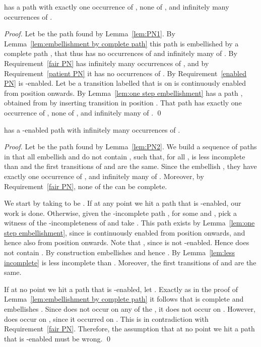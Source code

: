 \documentclass[smallcondensed]{svjour3}
\newcommand{\Lem}[1]{Lemma~\ref{lem:#1}}
\begin{document}
\begin{lemma}\label{lem:PN2}
   has a path with exactly one occurrence of , none of , and infinitely many occurrences of .
\end{lemma}
\begin{proof}
Let  be the path found by \Lem{PN1}.
By \Lem{embellishment by complete path} this path is embellished by a complete path ,
that thus has no occurrences of  and infinitely many of .
By Requirement~\ref{fair PN}  has infinitely many occurrences of ,
and by Requirement~\ref{patient PN} it has no occurrences of .
By Requirement~\ref{enabled PN}  is -enabled.
Let  be a transition labelled  that is on  is continuously enabled from position  onwards.
By \Lem{one step embellishment}  has a path , obtained from  by inserting
transition  in position . That path has exactly one occurrence of , none of , and infinitely many of .
\qed
\end{proof}

\begin{lemma}\label{lem:PN3}
   has a -enabled path with infinitely many occurrences of .
\end{lemma}

\begin{proof}
Let  be the path found by \Lem{PN2}.
We build a sequence  of paths in  that all embellish  and do not contain , such that, for all ,
 is less incomplete than  and the first  transitions of  and  are the same.
Since the  embellish , they have exactly one occurrence of , and infinitely many of .
Moreover, by Requirement~\ref{fair PN}, none of the  can be complete.

We start by taking  to be .
If at any point we hit a path  that is -enabled, our work is done.
Otherwise, given the -incomplete path , for some  and ,
pick a witness  of the -incompleteness of  and take .
This path exists by \Lem{one step embellishment}, since  is continuously enabled from position
 onwards, and hence also from position  onwards.
Note that , since  is not -enabled.
Hence  does not contain .
By construction  embellishes  and hence .
By \Lem{less incomplete}  is less incomplete than .
Moreover, the first  transitions of  and  are the same.

If at no point we hit a path  that is -enabled, let .
Exactly as in the proof of \Lem{embellishment by complete path} it follows that
 is complete and embellishes . Since  does not occur on any of the , it does
not occur on . However,  does occur on , since it occurred on .
This is in contradiction with Requirement~\ref{fair PN}.
Therefore, the assumption that at no point we hit a path  that is -enabled must be wrong.
\qed
\end{proof}
\end{document}
